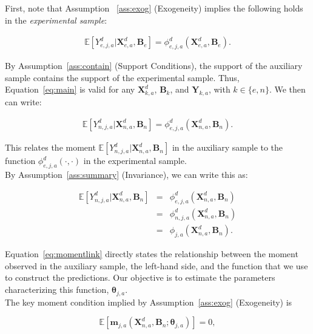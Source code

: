 \noindent First, note that Assumption ~\ref{ass:exog} (Exogeneity) implies the following holds in the \textit{experimental sample}: 

\begin{eqnarray}
\mathbb{E} \left[ Y_{e,j,a}^d | \bm{X}_{e,a}^d, \bm{B}_{e} \right] =  \phi^d_{e,j,a}\left( \bm{X}_{e,a}^d, \bm{B}_{e} \right). \label{eq:main}
\end{eqnarray}

\noindent By Assumption~\ref{ass:contain} (Support Conditions), the support of the auxiliary sample contains the support of the experimental sample. Thus, Equation~\eqref{eq:main} is valid for any $\bm{X}^d_{k,a}$, $\bm{B}_{k}$, and $\bm{Y}_{k,a}$, with $k \in \{ e, n\}$. We then can write: 

\begin{eqnarray}
\mathbb{E} \left[ Y_{n,j,a}^d | \bm{X}_{n,a}^d, \bm{B}_{n} \right] =  \phi^d_{e,j,a}\left( \bm{X}_{n,a}^d, \bm{B}_{n} \right).
\end{eqnarray}

\noindent This relates the moment $\mathbb{E} \left[ Y_{n,j,a}^d | \bm{X}_{n,a}^d, \bm{B}_{n} \right]$ in the auxiliary sample to the function  $\phi^d_{e,j,a}\left( \cdot, \cdot \right)$ in the experimental sample.\\

\noindent By Assumption~\ref{ass:summary} (Invariance), we can write this as: 

\begin{eqnarray}\label{eq:momentlink}
\mathbb{E} \left[ Y_{n,j,a}^d | \bm{X}_{n,a}^d, \bm{B}_{n} \right] &=&  \phi^d_{e,j,a}\left( \bm{X}_{n,a}^d, \bm{B}_{n} \right) \nonumber \\ 
 &=&  \phi^d_{n,j,a}\left( \bm{X}_{n,a}^d, \bm{B}_{n} \right) \nonumber \\
 &=&  \phi_{j,a}\left( \bm{X}_{n,a}^d, \bm{B}_{n} \right). \label{eq:mainpred}
\end{eqnarray}

\noindent Equation~\eqref{eq:momentlink} directly states the relationship between the moment observed in the auxiliary sample, the left-hand side, and the function that we use to construct the predictions. Our objective is to estimate the parameters characterizing this function, $\bm{\theta}_{j,a}$.\\ 

\noindent The key moment condition implied by Assumption~\ref{ass:exog} (Exogeneity) is 

\begin{equation}
\mathbb{E} \left[ \bm{m}_{j,a} \left( \bm{X}_{n,a}^d, \bm{B}_{n}; \bm{\theta}_{j,a} \right) \right] = 0, \label{eq:moment}
\end{equation}

